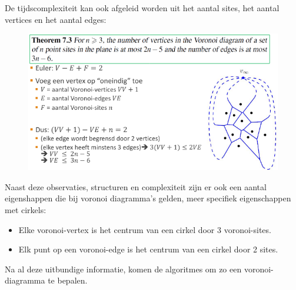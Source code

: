 \documentclass[12pt,a4paper]{article}
\begin{document}
	De tijdscomplexiteit kan ook afgeleid worden uit het aantal sites, het aantal vertices en het aantal edges: 
	\begin{figure}[H]
		\centering
		\includegraphics[width=0.8\linewidth]{afbeeldingen/voronoi/complexiteit}
		\label{fig:complexiteit}
	\end{figure}
	
	
	Naast deze observaties, structuren en complexiteit zijn er ook een aantal eigenshappen die bij voronoi diagramma's gelden, meer specifiek eigenschappen met cirkels: 
	
	\begin{itemize}
		\item Elke voronoi-vertex is het centrum van een cirkel door 3 voronoi-sites. 
		\item Elk punt op een voronoi-edge is het centrum van een cirkel door 2 sites.
	\end{itemize}
	
	Na al deze uitbundige informatie, komen de algoritmes om zo een voronoi-diagramma te bepalen. 
	
\end{document}
